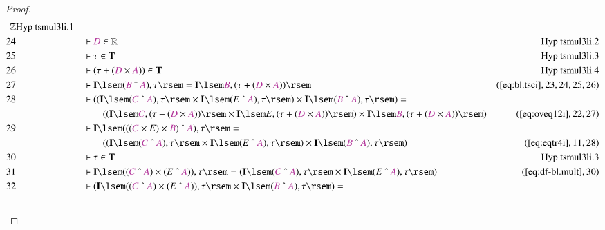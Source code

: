 \begin{proof}
\begin{align}
      \mathbb{Z}&\text{Hyp~tsmul3li.1}\notag%
  \\ 24 &&  & \vdash \mc{D} \in
      \mathbb{R}&\text{Hyp~tsmul3li.2}\notag%
  \\ 25 &&  & \vdash \tau \in
      \mathbf{T}&\text{Hyp~tsmul3li.3}\notag%
  \\ 26 &&  & \vdash ( \tau + ( \mc{D} \times \mc{A} ) ) \in
      \mathbf{T}&\text{Hyp~tsmul3li.4}\notag%
  \\ 27 &&  & \vdash \mathbf{I} \lsem ( \mc{B} ~\string^~ \mc{A} ) , \tau \rsem
      = \mathbf{I} \lsem \mc{B} , ( \tau + ( \mc{D} \times
      \mc{A} ) )
      \rsem&(\mbox{\ref{eq:bl.tsci}},23,24,25,26)\notag
  \\ 28 &&  & \vdash ( ( \mathbf{I} \lsem ( \mc{C} ~\string^~ \mc{A} ) , \tau
      \rsem \times \mathbf{I} \lsem ( E ~\string^~ \mc{A} )
      , \tau \rsem ) \times \mathbf{I} \lsem ( \mc{B}
      ~\string^~ \mc{A} ) , \tau \rsem ) =  \notag \\ & & & \qquad
     ( ( \mathbf{I}
      \lsem \mc{C} , ( \tau + ( \mc{D} \times \mc{A} ) )
      \rsem \times \mathbf{I} \lsem E , ( \tau + ( \mc{D}
      \times \mc{A} ) ) \rsem ) \times \mathbf{I} \lsem
      \mc{B} , ( \tau + ( \mc{D} \times \mc{A} ) ) \rsem
      )&(\mbox{\ref{eq:oveq12i}},22,27)\notag
  \\ 29 &&  & \vdash \mathbf{I} \lsem ( ( ( \mc{C} \times E ) \times \mc{B} )
      ~\string^~ \mc{A} ) , \tau \rsem =  \notag \\ & & & \qquad
     ( ( \mathbf{I}
      \lsem ( \mc{C} ~\string^~ \mc{A} ) , \tau \rsem \times
      \mathbf{I} \lsem ( E ~\string^~ \mc{A} ) , \tau \rsem
      ) \times \mathbf{I} \lsem ( \mc{B} ~\string^~ \mc{A} )
      , \tau \rsem )&(\mbox{\ref{eq:eqtr4i}},11,28)\notag
  \\ 30 &&  & \vdash \tau \in
      \mathbf{T}&\text{Hyp~tsmul3li.3}\notag%
  \\ 31 &&  & \vdash \mathbf{I} \lsem ( ( \mc{C} ~\string^~ \mc{A} ) \times ( E
      ~\string^~ \mc{A} ) ) , \tau \rsem = ( \mathbf{I}
      \lsem ( \mc{C} ~\string^~ \mc{A} ) , \tau \rsem \times
      \mathbf{I} \lsem ( E ~\string^~ \mc{A} ) , \tau \rsem
      )&(\mbox{\ref{eq:df-bl.mult}},30)\notag
  \\ 32 &&  & \vdash ( \mathbf{I} \lsem ( ( \mc{C} ~\string^~ \mc{A} ) \times (
      E ~\string^~ \mc{A} ) ) , \tau \rsem \times \mathbf{I}
      \lsem ( \mc{B} ~\string^~ \mc{A} ) , \tau \rsem ) =  \notag \\ & & & \qquad

\end{align}
\end{proof}

